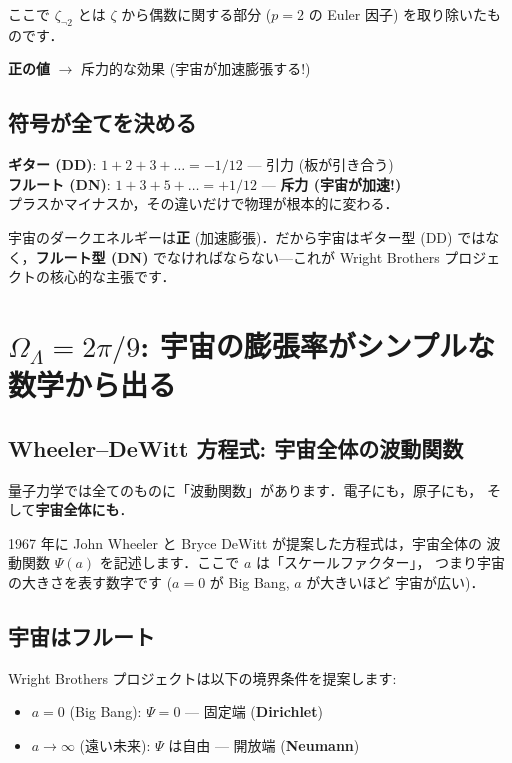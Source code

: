 \documentclass[11pt,a4paper]{article}
\begin{document}
ここで $\zeta_{\neg 2}$ とは $\zeta$ から偶数に関する部分 ($p=2$ の Euler 因子)
を取り除いたものです．

\textbf{正の値} $\to$ 斥力的な効果 (宇宙が加速膨張する!)

\subsection{符号が全てを決める}

\begin{tcolorbox}[colback=yellow!5,colframe=orange!60!black]
\textbf{ギター (DD)}: $1 + 2 + 3 + \ldots = -1/12$ --- 引力 (板が引き合う)\\
\textbf{フルート (DN)}: $1 + 3 + 5 + \ldots = +1/12$ --- \textbf{斥力 (宇宙が加速!)}\\[0.5em]
プラスかマイナスか，その違いだけで物理が根本的に変わる．
\end{tcolorbox}

宇宙のダークエネルギーは\textbf{正} (加速膨張)．だから宇宙はギター型 (DD)
ではなく，\textbf{フルート型 (DN)} でなければならない---これが Wright Brothers
プロジェクトの核心的な主張です．

\section{$\Omega_\Lambda = 2\pi/9$: 宇宙の膨張率がシンプルな数学から出る}

\subsection{Wheeler--DeWitt 方程式: 宇宙全体の波動関数}

量子力学では全てのものに「波動関数」があります．電子にも，原子にも，
そして\textbf{宇宙全体にも}．

1967 年に John Wheeler と Bryce DeWitt が提案した方程式は，宇宙全体の
波動関数 $\Psi(a)$ を記述します．ここで $a$ は「スケールファクター」，
つまり宇宙の大きさを表す数字です ($a = 0$ が Big Bang, $a$ が大きいほど
宇宙が広い)．

\subsection{宇宙はフルート}

Wright Brothers プロジェクトは以下の境界条件を提案します:
\begin{itemize}
\item $a = 0$ (Big Bang): $\Psi = 0$ --- 固定端 (\textbf{Dirichlet})
\item $a \to \infty$ (遠い未来): $\Psi$ は自由 --- 開放端 (\textbf{Neumann})
\end{itemize}
\end{document}
